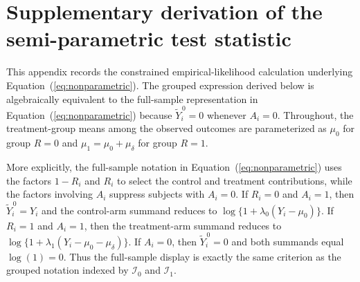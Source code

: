\documentclass[11pt]{article}
\begin{document}
\section{Supplementary derivation of the semi-parametric test statistic}\label{app:supplementary-derivation}

This appendix records the constrained empirical-likelihood calculation underlying Equation~(\ref{eq:nonparametric}). The grouped expression derived below is algebraically equivalent to the full-sample representation in Equation~(\ref{eq:nonparametric}) because $\widetilde{Y}_i^{\,0} = 0$ whenever $A_i = 0$. Throughout, the treatment-group means among the observed outcomes are parameterized as $\mu_0$ for group $R = 0$ and $\mu_1 = \mu_0 + \mu_\delta$ for group $R = 1$.

More explicitly, the full-sample notation in Equation~(\ref{eq:nonparametric}) uses the factors $1-R_i$ and $R_i$ to select the control and treatment contributions, while the factors involving $A_i$ suppress subjects with $A_i = 0$. If $R_i = 0$ and $A_i = 1$, then $\widetilde{Y}_i^{\,0} = Y_i$ and the control-arm summand reduces to $\log\{1 + \lambda_0(Y_i - \mu_0)\}$. If $R_i = 1$ and $A_i = 1$, then the treatment-arm summand reduces to $\log\{1 + \lambda_1(Y_i - \mu_0 - \mu_\delta)\}$. If $A_i = 0$, then $\widetilde{Y}_i^{\,0} = 0$ and both summands equal $\log(1) = 0$. Thus the full-sample display is exactly the same criterion as the grouped notation indexed by $\mathcal{I}_0$ and $\mathcal{I}_1$.
\end{document}
